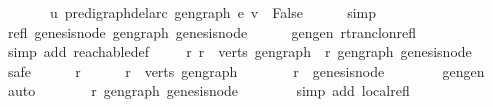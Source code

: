 \begin{isabellebody}
\ \ \ \ \ \ \ u\ {\isasymrightarrow}\isactrlsup {\isacharplus}{\kern0pt}\isactrlbsub pre{\isacharunderscore}{\kern0pt}digraph{\isachardot}{\kern0pt}del{\isacharunderscore}{\kern0pt}arc\ gen{\isacharunderscore}{\kern0pt}graph\ e\isactrlesub \ v\ {\isasymLongrightarrow}\ False{\isachardoublequoteclose}\isanewline
\ \ \ \ \isamarkupfalse%
\ simp\isanewline
{}\isamarkupfalse%
\ \ \isanewline
\ \ \isamarkupfalse%
\ refl{\isacharcolon}{\kern0pt}\ {\isachardoublequoteopen}genesis{\isacharunderscore}{\kern0pt}node\ {\isasymrightarrow}\isactrlsup {\isacharasterisk}{\kern0pt}\isactrlbsub gen{\isacharunderscore}{\kern0pt}graph\isactrlesub \ genesis{\isacharunderscore}{\kern0pt}node{\isachardoublequoteclose}\isanewline
\ \ \ \ \isamarkupfalse%
\ gen{\isacharunderscore}{\kern0pt}gen\ rtrancl{\isacharunderscore}{\kern0pt}on{\isacharunderscore}{\kern0pt}refl\isanewline
\ \ \ \ \isamarkupfalse%
\ {\isacharparenleft}{\kern0pt}simp\ add{\isacharcolon}{\kern0pt}\ reachable{\isacharunderscore}{\kern0pt}def{\isacharparenright}{\kern0pt}\ \isanewline
\ \ \isamarkupfalse%
\ {\isachardoublequoteopen}{\isasymforall}r{\isachardot}{\kern0pt}\ r\ {\isasymin}\ verts\ gen{\isacharunderscore}{\kern0pt}graph\ {\isasymlongrightarrow}\ r\ {\isasymrightarrow}\isactrlsup {\isacharasterisk}{\kern0pt}\isactrlbsub gen{\isacharunderscore}{\kern0pt}graph\isactrlesub \ genesis{\isacharunderscore}{\kern0pt}node{\isachardoublequoteclose}\ \ \isanewline
\ \ \isamarkupfalse%
\ safe\isanewline
\ \ \ \ \isamarkupfalse%
\ r\isanewline
\ \ \ \ \isamarkupfalse%
\ {\isachardoublequoteopen}r\ {\isasymin}\ verts\ gen{\isacharunderscore}{\kern0pt}graph{\isachardoublequoteclose}\isanewline
\ \ \ \ \isamarkupfalse%
\ \isamarkupfalse%
\ {\isachardoublequoteopen}r\ {\isacharequal}{\kern0pt}\ genesis{\isacharunderscore}{\kern0pt}node{\isachardoublequoteclose}\isanewline
\ \ \ \ \ \ \isamarkupfalse%
\ gen{\isacharunderscore}{\kern0pt}gen\ \isamarkupfalse%
\ auto\isanewline
\ \ \ \ \isamarkupfalse%
\ \isamarkupfalse%
\ {\isachardoublequoteopen}r\ {\isasymrightarrow}\isactrlsup {\isacharasterisk}{\kern0pt}\isactrlbsub gen{\isacharunderscore}{\kern0pt}graph\isactrlesub \ genesis{\isacharunderscore}{\kern0pt}node{\isachardoublequoteclose}\isanewline
\ \ \ \ \ \ \isamarkupfalse%
\ {\isacharparenleft}{\kern0pt}simp\ add{\isacharcolon}{\kern0pt}\ local{\isachardot}{\kern0pt}refl{\isacharparenright}{\kern0pt}\ \ \ \isanewline

\end{isabellebody}
